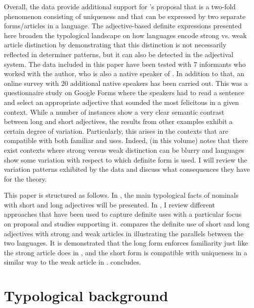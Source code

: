\documentclass[output=paper,
modfonts
]{langscibook}
\begin{document}
Overall, the  data provide additional support for \citeauthor{Schwarz2009}'s proposal that  is a two-fold phenomenon consisting of uniqueness and  that can be expressed by two separate forms/articles in a language. The adjective-based definite expressions presented here broaden the typological landscape on how languages encode strong vs. weak article distinction by demonstrating that this distinction is not necessarily reflected in determiner patterns, but it can also be detected in the adjectival system.
The  data included in this paper have been tested with 7 informants who worked with the author, who is also a native speaker of . In addition to that, an online survey with 20 additional native speakers has been carried out. This was a questionnaire study on Google Forms where the speakers had to read a sentence and select an appropriate adjective that sounded the most felicitous in a given context. While a number of instances show a very clear semantic contrast between long and short adjectives, the results from other examples exhibit a certain degree of variation. Particularly, this arises in the contexts that are compatible with both familiar and  uses. Indeed, \citet{SchwarzToappear} (in this volume) notes that there exist contexts where strong versus weak distinction can be blurry and languages show some variation with respect to which definite form is used. I will review the variation patterns exhibited by the data and discuss what consequences they have for the theory.

This paper is structured as follows. In , the main typological facts of nominals with short and long adjectives will be presented. In , I review different approaches that have been used to capture definite uses with a particular focus on  proposal and studies supporting it.  compares the definite use of short and long adjectives with strong and weak articles in  illustrating the parallels between the two languages. It is demonstrated that the long form enforces familiarity just like the strong article does in , and the short form is compatible with uniqueness in a similar way to the weak article in .  concludes.

\section{Typological background} \label{sec:sereikaite:2} 
\end{document}
